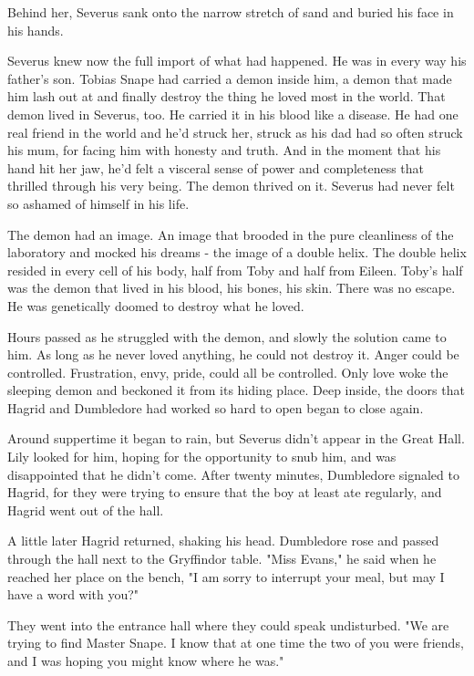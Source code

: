 \documentclass[a4paper,11pt]{article}
\begin{document}
Behind her, Severus sank onto the narrow stretch of sand and buried his face in his hands.

Severus knew now the full import of what had happened. He was in every way his father's son. Tobias Snape had carried a demon inside him, a demon that made him lash out at and finally destroy the thing he loved most in the world. That demon lived in Severus, too. He carried it in his blood like a disease. He had one real friend in the world and he'd struck her, struck as his dad had so often struck his mum, for facing him with honesty and truth. And in the moment that his hand hit her jaw, he'd felt a visceral sense of power and completeness that thrilled through his very being. The demon thrived on it. Severus had never felt so ashamed of himself in his life.

The demon had an image. An image that brooded in the pure cleanliness of the laboratory and mocked his dreams - the image of a double helix. The double helix resided in every cell of his body, half from Toby and half from Eileen. Toby's half was the demon that lived in his blood, his bones, his skin. There was no escape. He was genetically doomed to destroy what he loved.

Hours passed as he struggled with the demon, and slowly the solution came to him. As long as he never loved anything, he could not destroy it. Anger could be controlled. Frustration, envy, pride, could all be controlled. Only love woke the sleeping demon and beckoned it from its hiding place. Deep inside, the doors that Hagrid and Dumbledore had worked so hard to open began to close again.

Around suppertime it began to rain, but Severus didn't appear in the Great Hall. Lily looked for him, hoping for the opportunity to snub him, and was disappointed that he didn't come. After twenty minutes, Dumbledore signaled to Hagrid, for they were trying to ensure that the boy at least ate regularly, and Hagrid went out of the hall.

A little later Hagrid returned, shaking his head. Dumbledore rose and passed through the hall next to the Gryffindor table. "Miss Evans," he said when he reached her place on the bench, "I am sorry to interrupt your meal, but may I have a word with you?"

They went into the entrance hall where they could speak undisturbed. "We are trying to find Master Snape. I know that at one time the two of you were friends, and I was hoping you might know where he was."
\end{document}
